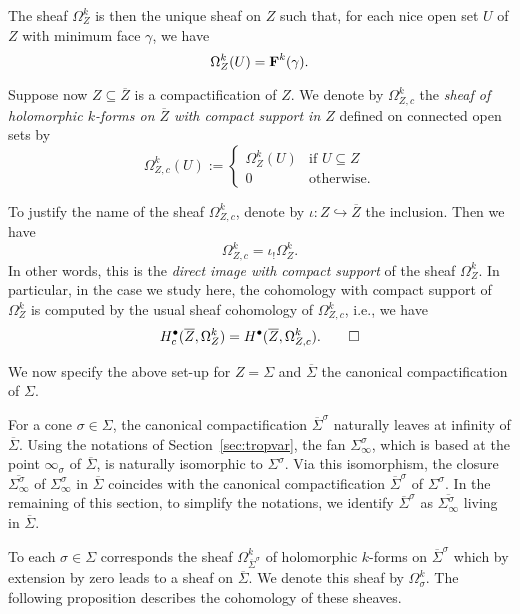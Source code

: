 \documentclass[11pt]{amsart}
\theoremstyle{definition}
\newenvironment{remark}
  {\pushQED{\qed}\renewcommand{\qedsymbol}{$\diamond$}\remm}
  {\popQED\endremm}
\numberwithin{equation}{section}
\newcommand{\ie}{i.e.}
\renewcommand{\~}{\widetilde}
\newcommand{\bul}{\bullet} %
\newcommand{\SF}{\textrm{\bf F}} %
\newcommand{\comp}[1]{\overline{#1}} %
\begin{document}
The sheaf $\Omega^k_Z$ is then the unique sheaf on $Z$ such that, for each nice open set $U$ of $Z$ with minimum face $\gamma$, we have
\[ \Omega^k_Z(U)=\SF^k(\gamma). \]

\medskip

Suppose now $Z \subseteq \comp Z$ is a compactification of $Z$. We denote by $\Omega^k_{Z,c}$ the \emph{sheaf of holomorphic $k$-forms on $\comp Z$ with compact support in $Z$} defined on connected open sets by
\[ \Omega^k_{Z,c}(U):=\begin{cases}
\Omega^k_Z(U) & \text{if $U\subseteq Z$} \\
0             & \text{otherwise.}
\end{cases} \]

\begin{remark} \label{rem:direct_image} To justify the name of the sheaf $\Omega^k_{Z,c}$, denote by $\iota\colon Z\hookrightarrow\comp Z$ the inclusion. Then we have
\[ \Omega^k_{Z,c}=\iota_!\Omega^k_Z. \]
In other words, this is the \emph{direct image with compact support} of the sheaf $\Omega^k_Z$. In particular, in the case we study here, the cohomology with compact support of $\Omega^k_Z$ is computed by the usual sheaf cohomology of $\Omega^k_{Z,c}$, \ie, we have
\[ H_c^\bul(\comp Z, \Omega^k_Z)=H^\bul(\comp Z, \Omega^k_{Z,c}). \qedhere \]
\end{remark}

We now specify the above set-up for $Z = \Sigma$ and $\comp \Sigma$ the canonical compactification of $\Sigma$.

\medskip

For a cone $\sigma \in \Sigma$, the canonical compactification $\comp\Sigma^\sigma$ naturally leaves at infinity of $\comp \Sigma$. Using the notations of Section~\ref{sec:tropvar}, the fan $\Sigma_\infty^\sigma$, which is based at the point $\infty_\sigma$ of $\comp \Sigma$, is naturally isomorphic to $\Sigma^\sigma$. Via this isomorphism, the closure $\comp{\Sigma_\infty^\sigma}$ of ${\Sigma_\infty^\sigma}$ in $\comp \Sigma$ coincides with the canonical compactification $\comp \Sigma^\sigma$ of $\Sigma^\sigma$. In the remaining of this section, to simplify the notations, we identify $\comp \Sigma^\sigma$ as $\comp{\Sigma_\infty^\sigma}$ living in $\comp \Sigma$.

\medskip

To each $\sigma \in \Sigma$ corresponds the sheaf $\Omega^k_{\comp \Sigma^\sigma}$ of holomorphic $k$-forms on $\comp \Sigma^\sigma$ which by extension by zero leads to a sheaf on $\comp \Sigma$. We denote this sheaf by $\Omega^k_\sigma$. The following proposition describes the cohomology of these sheaves.
\end{document}
